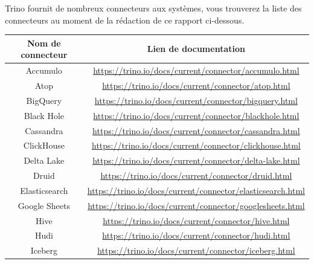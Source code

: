 Trino fournit de nombreux connecteurs aux systèmes, vous trouverez la liste des connecteurs au moment de la rédaction de ce rapport ci-dessous.

\begin{table}[ht]
\centering
	\begin{tabular}{|c|c|}
	\hline
	\textbf{Nom de connecteur} & \textbf{Lien de documentation} \\ \hline
	Accumulo & \href{https://trino.io/docs/current/connector/accumulo.html}{https://trino.io/docs/current/connector/accumulo.html} \\ \hline
	Atop & \href{https://trino.io/docs/current/connector/atop.html}{https://trino.io/docs/current/connector/atop.html} \\ \hline
	BigQuery & \href{https://trino.io/docs/current/connector/bigquery.html}{https://trino.io/docs/current/connector/bigquery.html} \\ \hline
	Black Hole & \href{https://trino.io/docs/current/connector/blackhole.html}{https://trino.io/docs/current/connector/blackhole.html} \\ \hline
	Cassandra & \href{https://trino.io/docs/current/connector/cassandra.html}{https://trino.io/docs/current/connector/cassandra.html} \\ \hline
	ClickHouse & \href{https://trino.io/docs/current/connector/clickhouse.html}{https://trino.io/docs/current/connector/clickhouse.html} \\ \hline
	Delta Lake & \href{https://trino.io/docs/current/connector/delta-lake.html}{https://trino.io/docs/current/connector/delta-lake.html} \\ \hline
	Druid & \href{https://trino.io/docs/current/connector/druid.html}{https://trino.io/docs/current/connector/druid.html} \\ \hline
	Elasticsearch & \href{https://trino.io/docs/current/connector/elasticsearch.html}{https://trino.io/docs/current/connector/elasticsearch.html} \\ \hline
	Google Sheets & \href{https://trino.io/docs/current/connector/googlesheets.html}{https://trino.io/docs/current/connector/googlesheets.html} \\ \hline
	Hive & \href{https://trino.io/docs/current/connector/hive.html}{https://trino.io/docs/current/connector/hive.html} \\ \hline
	Hudi & \href{https://trino.io/docs/current/connector/hudi.html}{https://trino.io/docs/current/connector/hudi.html} \\ \hline
	Iceberg & \href{https://trino.io/docs/current/connector/iceberg.html}{https://trino.io/docs/current/connector/iceberg.html} \\ \hline

\end{tabular}
\end{table}
